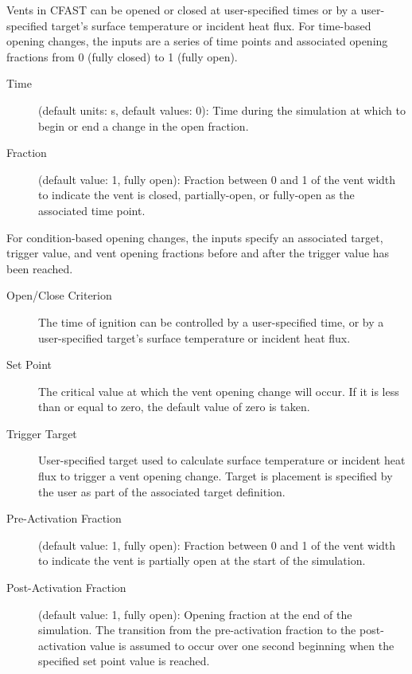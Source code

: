 Vents in CFAST can be opened or closed at user-specified times or by a user-specified target's surface temperature or incident heat flux. For time-based opening changes, the inputs are a series of time points and associated opening fractions from 0 (fully closed) to 1 (fully open).

\begin{description}
\item[Time] (default units: s, default values: 0): Time during the simulation at which to begin or end a change in the open fraction.
\item[Fraction] (default value: 1, fully open): Fraction between 0 and 1 of the vent width to indicate the vent is closed, partially-open, or fully-open as the associated time point.
\end{description}

For condition-based opening changes, the inputs specify an associated target, trigger value, and vent opening fractions before and after the trigger value has been reached.

\begin{description}
\item[Open/Close Criterion] The time of ignition can be controlled by a user-specified time, or by a user-specified target's surface temperature or incident heat flux.
\item[Set Point] The critical value at which the vent opening change will occur. If it is less than or equal to zero, the default value of zero is taken.
\item[Trigger Target] User-specified target used to calculate surface temperature or incident heat flux to trigger a vent opening change. Target is placement is specified by the user as part of the associated target definition.
\item[Pre-Activation Fraction] (default value: 1, fully open): Fraction between 0 and 1 of the vent width to indicate the vent is partially open at the start of the simulation.
\item[Post-Activation Fraction] (default value: 1, fully open): Opening fraction at the end of the simulation. The transition from the pre-activation fraction to the post-activation value is assumed to occur over one second beginning when the specified set point value is reached.
\end{description}





